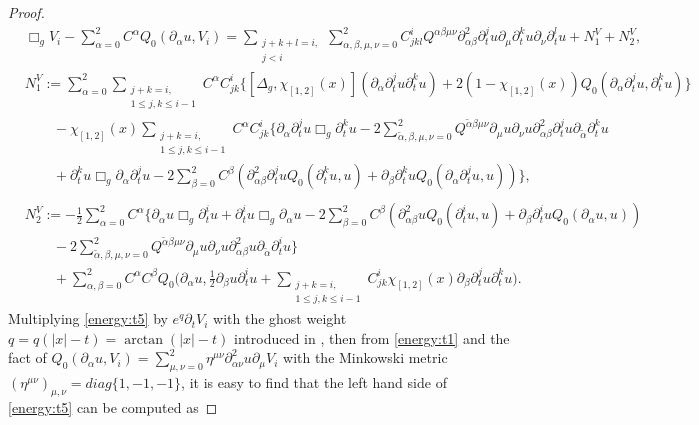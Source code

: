 \documentclass[11pt,twoside]{article}
\def\ds{\displaystyle}
\def\p{\partial}
\theoremstyle{plain}
\theoremstyle{definition}
\numberwithin{equation}{section}
\begin{document}
\begin{proof}
\begin{equation*}\label{energy:t5}
\begin{split}
&\Box_gV_i-\sum_{\alpha=0}^2C^{\alpha}Q_0(\p_{\alpha}u,V_i)
=\sum_{\substack{j+k+l=i,\\ j<i}}\sum_{\alpha,\beta,\mu,\nu=0}^2C^i_{jkl}Q^{\alpha\beta\mu\nu}\p^2_{\alpha\beta}\p_t^ju\p_{\mu}\p_t^ku\p_{\nu}\p_t^lu
+N^V_1+N^V_2,\\
&N^V_1:=\sum_{\alpha=0}^2\sum_{\substack{j+k=i,\\1\le j,k\le i-1}}C^{\alpha}C^i_{jk}\Big\{[\Delta_g,\chi_{[1,2]}(x)](\p_{\alpha}\p_t^ju\p_t^ku)
+2(1-\chi_{[1,2]}(x))Q_0(\p_{\alpha}\p_t^ju,\p_t^ku)\Big\}\\
&\qquad -\chi_{[1,2]}(x)\sum_{\substack{j+k=i,\\1\le j,k\le i-1}}C^{\alpha}C^i_{jk}\Big\{\p_{\alpha}\p_t^ju\Box_g\p_t^ku
-2\sum_{\tilde\alpha,\beta,\mu,\nu=0}^2Q^{\tilde\alpha\beta\mu\nu}\p_{\mu}u\p_{\nu}u\p^2_{\alpha\beta}\p_t^ju\p_{\tilde\alpha}\p_t^ku\\
&\qquad+\p_t^ku\Box_g\p_{\alpha}\p_t^ju-2\sum_{\beta=0}^2C^{\beta}(\p_{\alpha\beta}^2\p_t^juQ_0(\p_t^ku,u)
+\p_{\beta}\p_t^kuQ_0(\p_{\alpha}\p_t^ju,u))\Big\},\\
\end{split}
\end{equation*}
\begin{equation}\label{energy:t5}
\begin{split}
&N^V_2:=-\frac12\sum_{\alpha=0}^2C^{\alpha}\Big\{\p_{\alpha}u\Box_g\p_t^iu+\p_t^iu\Box_g\p_{\alpha}u
-2\sum_{\beta=0}^2C^{\beta}(\p^2_{\alpha\beta}uQ_0(\p_t^iu,u)+\p_{\beta}\p_t^iuQ_0(\p_{\alpha}u,u))\\
&\qquad-2\sum_{\tilde\alpha,\beta,\mu,\nu=0}^2Q^{\tilde\alpha\beta\mu\nu}\p_{\mu}u\p_{\nu}u\p^2_{\alpha\beta}u\p_{\tilde\alpha}\p_t^iu\Big\}\\
&\qquad+\sum_{\alpha,\beta=0}^2C^{\alpha}C^{\beta}Q_0\Big(\p_{\alpha}u,\frac12\p_{\beta}u\p_t^iu
+\sum_{\substack{j+k=i,\\1\le j,k\le i-1}}C^i_{jk}\chi_{[1,2]}(x)\p_{\beta}\p_t^ju\p_t^ku\Big).
\end{split}
\end{equation}
Multiplying \eqref{energy:t5} by $e^q\p_tV_i$ with the ghost weight $q=q(|x|-t)=\arctan(|x|-t)$ introduced in \cite{Alinhac01a},
then from \eqref{energy:t1} and the fact of $\ds Q_0(\p_{\alpha}u,V_i)=\sum_{\mu,\nu=0}^2\eta^{\mu\nu}\p^2_{\alpha\nu}u\p_{\mu}V_i$
with the Minkowski metric $(\eta^{\mu\nu})_{\mu,\nu}=diag\{1,-1,-1\}$,
it is easy to find that the left hand side of \eqref{energy:t5} can be computed as

\end{proof}
\end{document}
